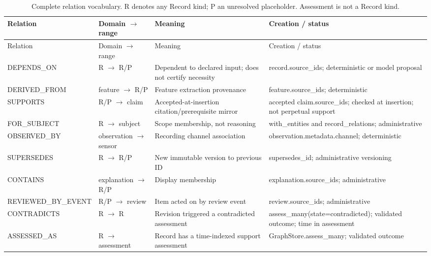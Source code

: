 \begingroup\footnotesize\setlength{\tabcolsep}{3pt}
\begin{longtable}{>{\raggedright\arraybackslash}p{}>{\raggedright\arraybackslash}p{}>{\raggedright\arraybackslash}p{}>{\raggedright\arraybackslash}p{}}
\caption{Complete relation vocabulary. R denotes any Record kind; P an unresolved placeholder. Assessment is not a Record kind.}\label{tab:fullrelations}\\
\toprule Relation & Domain $\to$ range & Meaning & Creation / status \\\midrule\endfirsthead
\toprule Relation & Domain $\to$ range & Meaning & Creation / status \\\midrule\endhead
DEPENDS\_\allowbreak ON & R $\to$ R/P & Dependent to declared input; does not certify necessity & record.\allowbreak{}source\_\allowbreak{}ids; deterministic or model proposal \\[3pt]
DERIVED\_\allowbreak FROM & feature $\to$ R/P & Feature extraction provenance & feature.\allowbreak{}source\_\allowbreak{}ids; deterministic \\[3pt]
SUPPORTS & R/P $\to$ claim & Accepted-at-insertion citation/prerequisite mirror & accepted claim.\allowbreak{}source\_\allowbreak{}ids; checked at insertion; not perpetual support \\[3pt]
FOR\_\allowbreak SUBJECT & R $\to$ subject & Scope membership, not reasoning & with\_\allowbreak{}entities and record\_\allowbreak{}relations; administrative \\[3pt]
OBSERVED\_\allowbreak BY & observation $\to$ sensor & Recording channel association & observation.\allowbreak{}metadata.\allowbreak{}channel; deterministic \\[3pt]
SUPERSEDES & R $\to$ R/P & New immutable version to previous ID & supersedes\_\allowbreak{}id; administrative versioning \\[3pt]
CONTAINS & explanation $\to$ R/P & Display membership & explanation.\allowbreak{}source\_\allowbreak{}ids; administrative \\[3pt]
REVIEWED\_\allowbreak BY\_\allowbreak EVENT & R/P $\to$ review & Item acted on by review event & review.\allowbreak{}source\_\allowbreak{}ids; administrative \\[3pt]
CONTRADICTS & R $\to$ R & Revision triggered a contradicted assessment & assess\_\allowbreak{}many(state=\allowbreak{}contradicted); validated outcome; time in assessment \\[3pt]
ASSESSED\_\allowbreak AS & R $\to$ assessment & Record has a time-indexed support assessment & GraphStore.\allowbreak{}assess\_\allowbreak{}many; validated outcome \\[3pt]
\bottomrule\end{longtable}\endgroup